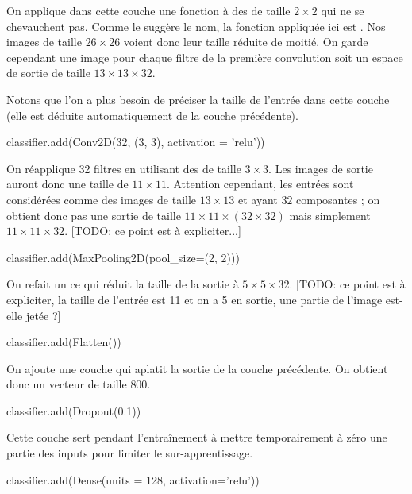 On applique dans cette couche une fonction à des  de taille $2 \times 2$ 
qui ne se chevauchent pas. 
Comme le suggère le nom, la fonction appliquée ici est . 
Nos images de taille $26 \times 26$ voient donc leur taille réduite de moitié. 
On garde cependant une image pour chaque filtre de la première convolution 
soit un espace de sortie de taille $13 \times 13 \times 32$.

Notons que l'on a plus besoin de préciser la taille de l'entrée dans cette 
couche (elle est déduite automatiquement de la couche précédente).

\begin{codeblock}
classifier.add(Conv2D(32, (3, 3), activation = 'relu'))
\end{codeblock}

On réapplique 32 filtres en utilisant des  de taille 
$3 \times 3$. 
Les images de sortie auront donc une taille de $11 \times 11$.
Attention cependant, les entrées sont considérées comme des images 
de taille $13 \times 13$ et ayant $32$ composantes ; 
on obtient donc pas une sortie de taille $11 \times 11 \times (32 \times 32)$ 
mais simplement $11 \times 11 \times 32$. [TODO: ce point est à expliciter...]


\begin{codeblock}
classifier.add(MaxPooling2D(pool_size=(2, 2)))
\end{codeblock}

On refait un  ce qui réduit la taille de la sortie 
à $5 \times 5 \times 32$. 
[TODO: ce point est à expliciter, la taille de l'entrée est 11 et on a 5 en sortie, 
une partie de l'image est-elle jetée ?]


\begin{codeblock}
classifier.add(Flatten())
\end{codeblock}

On ajoute une couche qui aplatit la sortie de la couche précédente.
On obtient donc un vecteur de taille $800$.


\begin{codeblock}
classifier.add(Dropout(0.1)) 
\end{codeblock}

Cette couche sert pendant l'entraînement à mettre temporairement à zéro 
une partie des inputs pour limiter le sur-apprentissage.

\begin{codeblock}
classifier.add(Dense(units = 128, activation='relu'))
\end{codeblock}

